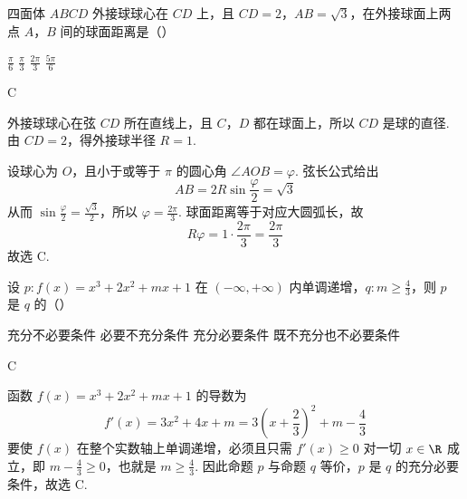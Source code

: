 \begin{problem}
四面体 \(ABCD\) 外接球球心在 \(CD\) 上，且 \(CD = 2\)，\(AB = \sqrt{3}\)，在外接球面上两点 \(A\)，\(B\) 间的球面距离是（\quad）

\choices
    {\(\frac{\pi}{6}\)}
    {\(\frac{\pi}{3}\)}
    {\(\frac{2\pi}{3}\)}
    {\(\frac{5\pi}{6}\)}

\begin{answer}
C
\end{answer}

\begin{solution}
外接球球心在弦 \(CD\) 所在直线上，且 \(C\)，\(D\) 都在球面上，所以 \(CD\) 是球的直径. 由 \(CD=2\)，得外接球半径 \(R=1\).

设球心为 \(O\)，且小于或等于 \(\pi\) 的圆心角 \(\angle AOB=\varphi\). 弦长公式给出
\[
AB=2R\sin\frac{\varphi}{2}=\sqrt{3}
\]
从而 \(\sin\frac{\varphi}{2}=\frac{\sqrt{3}}{2}\)，所以 \(\varphi=\frac{2\pi}{3}\). 球面距离等于对应大圆弧长，故
\[
R\varphi=1\cdot\frac{2\pi}{3}=\frac{2\pi}{3}
\]
故选 C.
\end{solution}
\end{problem}

\begin{problem}
设 \( p: f(x) = x^3 + 2x^2 + mx + 1 \) 在 \((- \infty, +\infty)\) 内单调递增，\( q: m \geqslant \frac{4}{3} \)，则 \( p \) 是 \( q \) 的（\quad）

\choices
    {充分不必要条件}
    {必要不充分条件}
    {充分必要条件}
    {既不充分也不必要条件}

\begin{answer}
C
\end{answer}

\begin{solution}
函数 \(f(x)=x^3+2x^2+mx+1\) 的导数为
\[
f'(x)=3x^2+4x+m=3\left(x+\frac{2}{3}\right)^2+m-\frac{4}{3}
\]
要使 \(f(x)\) 在整个实数轴上单调递增，必须且只需 \(f'(x)\geqslant0\) 对一切 \(x\in\R\) 成立，即
\(m-\frac{4}{3}\geqslant0\)，也就是 \(m\geqslant\frac{4}{3}\). 因此命题 \(p\) 与命题 \(q\) 等价，\(p\) 是 \(q\) 的充分必要条件，故选 C.
\end{solution}
\end{problem}

